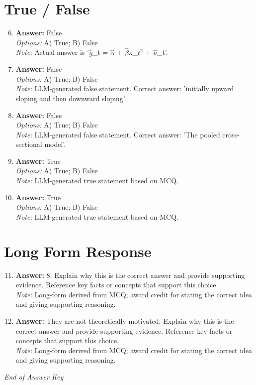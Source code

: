 \documentclass[12pt]{article}
\begin{document}
\section*{True / False}
\begin{enumerate}[label=\arabic*.]
\setcounter{enumi}{5}
\item \textbf{Answer:} False
\\ \textit{Options:} A) True; B) False
\\ \textit{Note:} Actual answer is '\ensuremath{\hat{y}}\_t = \ensuremath{\hat{\alpha}} + \ensuremath{\hat{\beta}}x\_$t^2$ + \ensuremath{\hat{u}}\_t'.
\item \textbf{Answer:} False
\\ \textit{Options:} A) True; B) False
\\ \textit{Note:} LLM-generated false statement. Correct answer: 'initially upward sloping and then downward sloping'.
\item \textbf{Answer:} False
\\ \textit{Options:} A) True; B) False
\\ \textit{Note:} LLM-generated false statement. Correct answer: 'The pooled cross-sectional model'.
\item \textbf{Answer:} True
\\ \textit{Options:} A) True; B) False
\\ \textit{Note:} LLM-generated true statement based on MCQ.
\item \textbf{Answer:} True
\\ \textit{Options:} A) True; B) False
\\ \textit{Note:} LLM-generated true statement based on MCQ.
\end{enumerate}

\section*{Long Form Response}
\begin{enumerate}[label=\arabic*.]
\setcounter{enumi}{10}
\item \textbf{Answer:} 8. Explain why this is the correct answer and provide supporting evidence. Reference key facts or concepts that support this choice.
\\ \textit{Note:} Long-form derived from MCQ; award credit for stating the correct idea and giving supporting reasoning.
\item \textbf{Answer:} They are not theoretically motivated. Explain why this is the correct answer and provide supporting evidence. Reference key facts or concepts that support this choice.
\\ \textit{Note:} Long-form derived from MCQ; award credit for stating the correct idea and giving supporting reasoning.
\end{enumerate}

\vfill
\noindent\textit{End of Answer Key}
\end{document}
